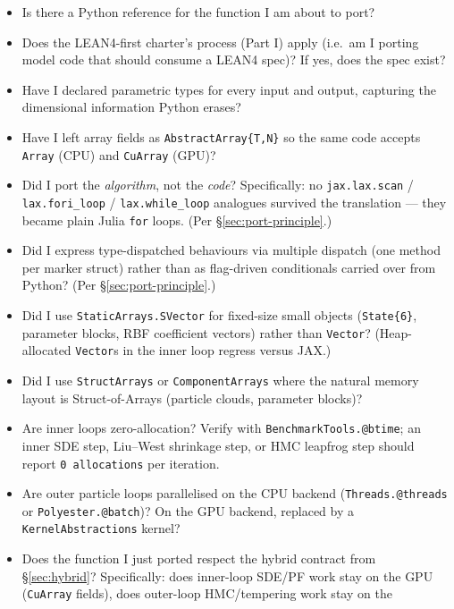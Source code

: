 \documentclass[11pt,a4paper]{article}
\begin{document}
\begin{itemize}
\item[$\square$] Is there a Python reference for the function I
  am about to port?
\item[$\square$] Does the LEAN4-first charter's process (Part I)
  apply (i.e.\ am I porting model code that should consume a
  LEAN4 spec)? If yes, does the spec exist?
\item[$\square$] Have I declared parametric types for every
  input and output, capturing the dimensional information Python
  erases?
\item[$\square$] Have I left array fields as
  \texttt{AbstractArray\{T,N\}} so the same code accepts
  \texttt{Array} (CPU) and \texttt{CuArray} (GPU)?
\item[$\square$] Did I port the \emph{algorithm}, not the
  \emph{code}? Specifically: no \texttt{jax.lax.scan} /
  \texttt{lax.fori\_loop} / \texttt{lax.while\_loop} analogues
  survived the translation --- they became plain Julia
  \texttt{for} loops. (Per §\ref{sec:port-principle}.)
\item[$\square$] Did I express type-dispatched behaviours via
  multiple dispatch (one method per marker struct) rather than
  as flag-driven conditionals carried over from Python? (Per
  §\ref{sec:port-principle}.)
\item[$\square$] Did I use \texttt{StaticArrays.SVector} for
  fixed-size small objects (\texttt{State\{6\}}, parameter
  blocks, RBF coefficient vectors) rather than \texttt{Vector}?
  (Heap-allocated \texttt{Vector}s in the inner loop regress
  versus JAX.)
\item[$\square$] Did I use \texttt{StructArrays} or
  \texttt{ComponentArrays} where the natural memory layout is
  Struct-of-Arrays (particle clouds, parameter blocks)?
\item[$\square$] Are inner loops zero-allocation?
  Verify with \texttt{BenchmarkTools.@btime}; an inner SDE step,
  Liu--West shrinkage step, or HMC leapfrog step should report
  \texttt{0 allocations} per iteration.
\item[$\square$] Are outer particle loops parallelised on the
  CPU backend (\texttt{Threads.@threads} or
  \texttt{Polyester.@batch})? On the GPU backend, replaced by a
  \texttt{KernelAbstractions} kernel?
\item[$\square$] Does the function I just ported respect the
  hybrid contract from §\ref{sec:hybrid}? Specifically: does
  inner-loop SDE/PF work stay on the GPU (\texttt{CuArray}
  fields), does outer-loop HMC/tempering work stay on the

\end{itemize}
\end{document}
